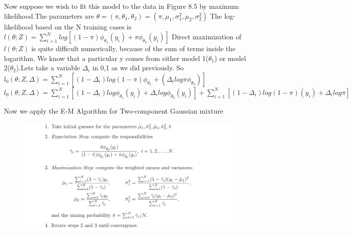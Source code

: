 \documentclass[11pt]{beamer}
\begin{document}
\begin{frame}
\textsf{Now suppose we wish to fit this model to the data in Figure 8.5 by maximum likelihood.The parameters are\linebreak
$\theta = (\pi, \theta_{1} , \theta_{2}) = (\pi, \mu_{1} , \sigma_{1}^2 , \mu_{2} , \sigma_{2}^2)$\linebreak
The log-likelihood based on the N training cases is}\linebreak\linebreak
$l(\theta; Z) = \sum_{i=1}^{N}  log[(1- \pi)\phi _{\theta_{1}} (y_{i}) + \pi\phi _{\theta_{2}} (y_{i} )]$\linebreak\linebreak
\textsf{Direct maximization of $l(\theta; Z)$ is quite difficult numerically, because of
the sum of terms inside the logarithm. We know that a particular y comes from either model 1($\theta_{1}$) or model 2($\theta_{2}$).Lets take a variable $\Delta_{i}$ in {0,1} as we did previously. So 
\linebreak \linebreak
$l_{0}(\theta;Z,\Delta) = \sum_{i=1}^{N}[(1-\Delta_{i})log(1-\pi)\phi_{\theta_{1}} + (\Delta_{i}log\pi\phi_{\theta_{2}})] $
\linebreak \linebreak
$l_{0}(\theta;Z,\Delta) = \sum_{i=1}^{N}[(1-\Delta_{i})log\phi_{\theta_{1}}(y_{i}) + \Delta_{i}log\phi_{\theta_{2}}(y_{i})] + \sum_{i=1}^{N}[(1-\Delta_{i})log(1-\pi)(y_{i}) + \Delta_{i}log\pi]$}
\end{frame}


\begin{frame}

\textsf{\linebreak\linebreak
Now we apply the E-M Algorithm for Two-component Gaussian mixture}
\begin{figure}
\includegraphics[scale=.215]{fig10.jpg}
\end{figure}
\end{frame}
\end{document}
